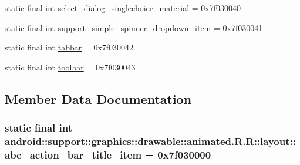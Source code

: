\begin{CompactItemize}
\item 
static final int \hyperlink{classandroid_1_1support_1_1graphics_1_1drawable_1_1animated_1_1_r_1_1layout_f378f0b7e0d83ccf17018511497039e1}{select\_\-dialog\_\-singlechoice\_\-material} = 0x7f030040
\item 
static final int \hyperlink{classandroid_1_1support_1_1graphics_1_1drawable_1_1animated_1_1_r_1_1layout_4949336a4e6ec0db93111b839d21c1a0}{support\_\-simple\_\-spinner\_\-dropdown\_\-item} = 0x7f030041
\item 
static final int \hyperlink{classandroid_1_1support_1_1graphics_1_1drawable_1_1animated_1_1_r_1_1layout_52ac1a0919c8e8c8186342f81d1f937d}{tabbar} = 0x7f030042
\item 
static final int \hyperlink{classandroid_1_1support_1_1graphics_1_1drawable_1_1animated_1_1_r_1_1layout_e9076199956a77a9d1b510b6a594b144}{toolbar} = 0x7f030043
\end{CompactItemize}


\subsection{Member Data Documentation}
\hypertarget{classandroid_1_1support_1_1graphics_1_1drawable_1_1animated_1_1_r_1_1layout_4438a70d949cab42baf07016ab1a3544}{
\subsubsection[{abc\_\-action\_\-bar\_\-title\_\-item}]{\setlength{\rightskip}{0pt plus 5cm}static final int android::support::graphics::drawable::animated.R.R::layout::abc\_\-action\_\-bar\_\-title\_\-item = 0x7f030000}}
\label{classandroid_1_1support_1_1graphics_1_1drawable_1_1animated_1_1_r_1_1layout_4438a70d949cab42baf07016ab1a3544}



